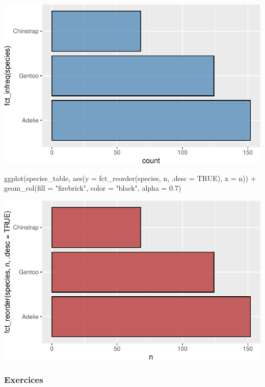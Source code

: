 \documentclass[
  a4paper,
  DIV=11,
  numbers=noendperiod,
  oneside]{scrreprt}
\newenvironment{Shaded}{}{}
\newcommand{\AttributeTok}[1]{\textcolor[rgb]{0.84,0.23,0.29}{#1}}
\newcommand{\ConstantTok}[1]{\textcolor[rgb]{0.00,0.36,0.77}{#1}}
\newcommand{\FloatTok}[1]{\textcolor[rgb]{0.00,0.36,0.77}{#1}}
\newcommand{\FunctionTok}[1]{\textcolor[rgb]{0.44,0.26,0.76}{#1}}
\newcommand{\NormalTok}[1]{\textcolor[rgb]{0.14,0.16,0.18}{#1}}
\newcommand{\SpecialCharTok}[1]{\textcolor[rgb]{0.00,0.36,0.77}{#1}}
\newcommand{\StringTok}[1]{\textcolor[rgb]{0.01,0.18,0.38}{#1}}
\begin{document}
\includegraphics{03-visualization_files/figure-pdf/unnamed-chunk-44-1.pdf}

\begin{Shaded}
\begin{Highlighting}[]
\FunctionTok{ggplot}\NormalTok{(species\_table, }
       \FunctionTok{aes}\NormalTok{(}\AttributeTok{y =} \FunctionTok{fct\_reorder}\NormalTok{(species, n, }\AttributeTok{.desc =} \ConstantTok{TRUE}\NormalTok{), }\AttributeTok{x =}\NormalTok{ n)) }\SpecialCharTok{+}
  \FunctionTok{geom\_col}\NormalTok{(}\AttributeTok{fill =} \StringTok{"firebrick"}\NormalTok{, }\AttributeTok{color =} \StringTok{"black"}\NormalTok{, }\AttributeTok{alpha =} \FloatTok{0.7}\NormalTok{)}
\end{Highlighting}
\end{Shaded}

\includegraphics{03-visualization_files/figure-pdf/unnamed-chunk-44-2.pdf}

\subsubsection{Exercices}\label{sec-exo-6}
\end{document}
